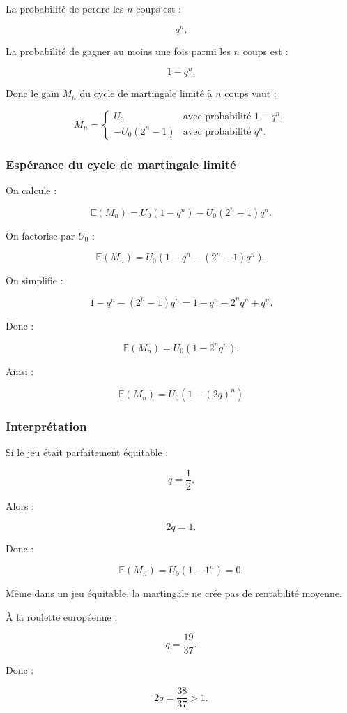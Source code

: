 \documentclass[11pt,a4paper]{article}
\begin{document}
La probabilité de perdre les \(n\) coups est :

\[
q^n.
\]

La probabilité de gagner au moins une fois parmi les \(n\) coups est :

\[
1-q^n.
\]

Donc le gain \(M_n\) du cycle de martingale limité à \(n\) coups vaut :

\[
M_n=
\begin{cases}
U_0 & \text{avec probabilité }1-q^n,\\
-U_0(2^n-1) & \text{avec probabilité }q^n.
\end{cases}
\]

\subsubsection*{Espérance du cycle de martingale limité}

On calcule :

\[
\mathbb{E}(M_n)
=
U_0(1-q^n)-U_0(2^n-1)q^n.
\]

On factorise par \(U_0\) :

\[
\mathbb{E}(M_n)
=
U_0\left(1-q^n-(2^n-1)q^n\right).
\]

On simplifie :

\[
1-q^n-(2^n-1)q^n
=
1-q^n-2^nq^n+q^n.
\]

Donc :

\[
\mathbb{E}(M_n)
=
U_0(1-2^nq^n).
\]

Ainsi :

\[
\boxed{\mathbb{E}(M_n)=U_0\left(1-(2q)^n\right)}
\]

\subsubsection*{Interprétation}

Si le jeu était parfaitement équitable :

\[
q=\frac12.
\]

Alors :

\[
2q=1.
\]

Donc :

\[
\mathbb{E}(M_n)=U_0(1-1^n)=0.
\]

Même dans un jeu équitable, la martingale ne crée pas de rentabilité moyenne.

À la roulette européenne :

\[
q=\frac{19}{37}.
\]

Donc :

\[
2q=\frac{38}{37}>1.
\]
\end{document}
